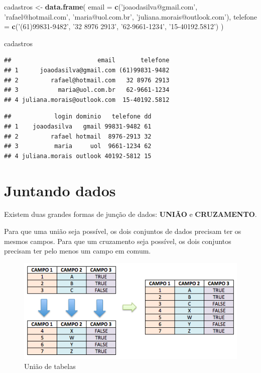 \documentclass[]{book}
\newenvironment{Shaded}{\begin{snugshade}}{\end{snugshade}}
\newcommand{\KeywordTok}[1]{\textcolor[rgb]{0.13,0.29,0.53}{\textbf{#1}}}
\newcommand{\DataTypeTok}[1]{\textcolor[rgb]{0.13,0.29,0.53}{#1}}
\newcommand{\StringTok}[1]{\textcolor[rgb]{0.31,0.60,0.02}{#1}}
\newcommand{\NormalTok}[1]{#1}
\begin{document}
\begin{Shaded}
\begin{Highlighting}[]
\NormalTok{cadastros <-}\StringTok{ }\KeywordTok{data.frame}\NormalTok{(}
  \DataTypeTok{email =} \KeywordTok{c}\NormalTok{(}\StringTok{'joaodasilva@gmail.com'}\NormalTok{, }\StringTok{'rafael@hotmail.com'}\NormalTok{, }\StringTok{'maria@uol.com.br'}\NormalTok{, }\StringTok{'juliana.morais@outlook.com'}\NormalTok{),}
  \DataTypeTok{telefone =} \KeywordTok{c}\NormalTok{(}\StringTok{'(61)99831-9482'}\NormalTok{, }\StringTok{'32 8976 2913'}\NormalTok{, }\StringTok{'62-9661-1234'}\NormalTok{, }\StringTok{'15-40192.5812'}\NormalTok{)}
\NormalTok{)}

\NormalTok{cadastros}
\end{Highlighting}
\end{Shaded}

\begin{verbatim}
##                        email       telefone
## 1      joaodasilva@gmail.com (61)99831-9482
## 2         rafael@hotmail.com   32 8976 2913
## 3           maria@uol.com.br   62-9661-1234
## 4 juliana.morais@outlook.com  15-40192.5812
\end{verbatim}

\begin{verbatim}
##            login dominio   telefone dd
## 1    joaodasilva   gmail 99831-9482 61
## 2         rafael hotmail  8976-2913 32
## 3          maria     uol  9661-1234 62
## 4 juliana.morais outlook 40192-5812 15
\end{verbatim}

\chapter{Juntando dados}\label{juntando-dados}

Existem duas grandes formas de junção de dados: \textbf{UNIÃO} e
\textbf{CRUZAMENTO}.

Para que uma união seja possível, os dois conjuntos de dados precisam
ter os mesmos campos. Para que um cruzamento seja possível, os dois
conjuntos precisam ter pelo menos um campo em comum.

\begin{figure}

{\centering \includegraphics[width=1\linewidth]{imagens/union} 

}

\caption{União de tabelas}\label{fig:unnamed-chunk-96}
\end{figure}
\end{document}
